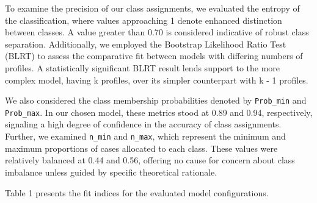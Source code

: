 \documentclass[
  man,floatsintext]{apa7}
\begin{document}
To examine the precision of our class assignments, we evaluated the entropy of the classification, where values approaching 1 denote enhanced distinction between classes. A value greater than 0.70 is considered indicative of robust class separation. Additionally, we employed the Bootstrap Likelihood Ratio Test (BLRT) to assess the comparative fit between models with differing numbers of profiles. A statistically significant BLRT result lends support to the more complex model, having k profiles, over its simpler counterpart with k - 1 profiles.

We also considered the class membership probabilities denoted by \texttt{Prob\_min} and \texttt{Prob\_max}. In our chosen model, these metrics stood at 0.89 and 0.94, respectively, signaling a high degree of confidence in the accuracy of class assignments. Further, we examined \texttt{n\_min} and \texttt{n\_max}, which represent the minimum and maximum proportions of cases allocated to each class. These values were relatively balanced at 0.44 and 0.56, offering no cause for concern about class imbalance unless guided by specific theoretical rationale.

Table 1 presents the fit indices for the evaluated model configurations.
\end{document}
